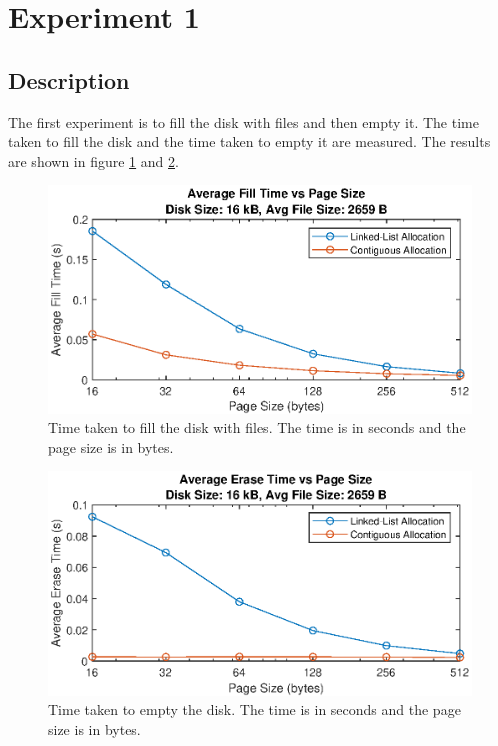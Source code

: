 \documentclass[10pt,a4paper]{ULBreport}
\begin{document}
\section{Experiment 1}
\subsection{Description}
The first experiment is to fill the disk with files and then empty it. The time taken to fill the disk and the time taken to empty it are measured. The results are shown in figure \ref{fig:fillDisk} and \ref{fig:emptyDisk}. \\
\begin{figure}
    \centering
    \includegraphics[width=1\textwidth]{FillDisk.eps}
    \caption{Time taken to fill the disk with files. The time is in seconds and the page size is in bytes.}
    \label{fig:fillDisk}
\end{figure}
\begin{figure}
    \centering
    \includegraphics[width=1\textwidth]{EraseDisk.eps}
    \caption{Time taken to empty the disk. The time is in seconds and the page size is in bytes.}
    \label{fig:emptyDisk}
\end{figure}
\end{document}
